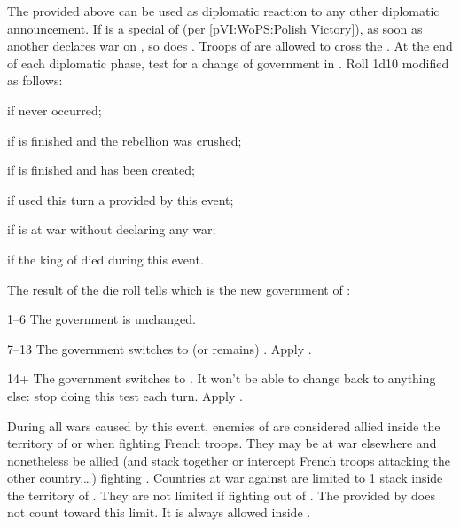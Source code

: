 \phdipl
\aparag The \CB provided above can be used as diplomatic reaction to any other
diplomatic announcement.
\bparag If \payspologne is a special \EG of \FRA (per \ref{pVI:WoPS:Polish
  Victory}), as soon as another \MAJ declares war on \FRA, so does
\payspologne. Troops of \payspologne are allowed to cross the \HRE.
\aparag At the end of each diplomatic phase, test for a change of government
in \paysmajeurFrance. Roll 1d10 modified as follows:
\begin{modlist}
\item[\bonus{-4}] if  never occurred;
\item[\bonus{-2}] if  is finished and the
  rebellion was crushed;
\item[\bonus{+2}] if  is finished and \paysusa
  has been created;
\item[\bonus{+2}] if \FRA used this turn a \CB provided by this event;
\item[\bonus{+4}] if \FRA is at war without declaring any war;
\item[\bonus{+6}] if the king of \FRA died during this event.
\end{modlist}
\aparag The result of the die roll tells which is the new government of \FRA:
\begin{modlist}[2em]
\item[1--6] The government is unchanged.
\item[7--13] The government switches to (or remains)
  \monarqueConvention. Apply .
\item[14+] The government switches to \monarqueTerror. It won't be able to
  change back to anything else: stop doing this test each turn. Apply
  .
\end{modlist}

\phmil
\aparag During all wars caused by this event, enemies of \FRA are considered
allied inside the territory of \FRA or when fighting French troops. They may
be at war elsewhere and nonetheless be allied (and stack together or intercept
French troops attacking the other country,\ldots) fighting \FRA.
\aparag Countries at war against \FRA are limited to 1 stack inside the
territory of \FRA.
\bparag They are not limited if fighting out of \FRA.
\bparag The \ARMY provided by  does not count
toward this limit. It is always allowed inside \FRA.

